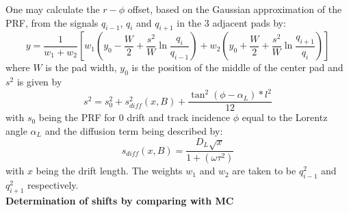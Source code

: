 \documentclass{alicetdr}
\begin{document}
One may calculate the $r-\phi$ offset, based on the Gaussian approximation of 
the PRF, from the signals $q_{i-1}$, $q_i$ and $q_{i+1}$ in the 3 adjacent pads 
by:
\begin{equation}
y = \frac{1}{w_{1}+w_{2}} \left[ w_{1} \left( y_{0}-\frac{W}{2}
                                                   +\frac{s^{2}}{W}
                                                    \ln\frac{q_{i}}{q_{i-1}} \right)
                                + w_{2}\left( y_{0}+\frac{W}{2}
                                                   +\frac{s^{2}}{W}
                                                    \ln\frac{q_{i+1}}{q_{i}} \right) \right]
\end{equation}
where $W$ is the pad width, $y_0$ is the position of the middle of the center 
pad and $s^2$ is given by
\begin{equation}
s^{2} = s^{2}_{0} + s^{2}_{diff} (x,B) + \frac{\tan^{2}(\phi-\alpha_{L})*l^{2}}{12}
\end{equation}
with $s_0$ being the PRF for 0 drift and track incidence $\phi$ equal to the Lorentz 
angle $\alpha_L$ and the diffusion term being described by:
\begin{equation}
s_{diff} (x,B) = \frac{D_{L}\sqrt{x}}{1+({\omega\tau}^{2})}
\end{equation}
with $x$ being the drift length. The weights $w_1$ and $w_2$ are taken to be 
$q_{i-1}^2$ and $q_{i+1}^2$ respectively.
\\

\noindent
{\bf Determination of shifts by comparing with MC}
\\
\end{document}
